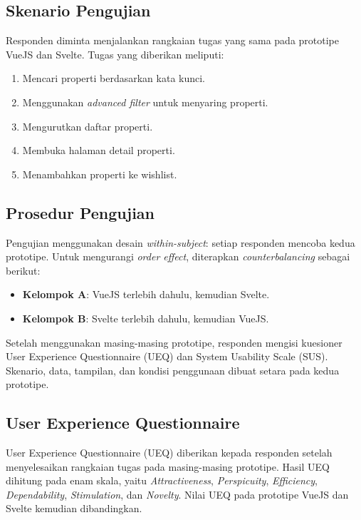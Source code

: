 \documentclass[12pt,a4paper]{report}
\begin{document}
\subsection{Skenario Pengujian}
\label{sec:skenario-ux}
Responden diminta menjalankan rangkaian tugas yang sama pada prototipe VueJS dan Svelte. Tugas yang diberikan meliputi:
\begin{enumerate}
    \item Mencari properti berdasarkan kata kunci.
    \item Menggunakan \textit{advanced filter} untuk menyaring properti.
    \item Mengurutkan daftar properti.
    \item Membuka halaman detail properti.
    \item Menambahkan properti ke wishlist.
\end{enumerate}

\subsection{Prosedur Pengujian}
\label{sec:prosedur-ux}
Pengujian menggunakan desain \textit{within-subject}: setiap responden mencoba kedua prototipe. Untuk mengurangi \textit{order effect}, diterapkan \textit{counterbalancing} sebagai berikut:
\begin{itemize}
    \item \textbf{Kelompok A}: VueJS terlebih dahulu, kemudian Svelte.
    \item \textbf{Kelompok B}: Svelte terlebih dahulu, kemudian VueJS.
\end{itemize}

Setelah menggunakan masing-masing prototipe, responden mengisi kuesioner User Experience Questionnaire (UEQ) dan System Usability Scale (SUS). Skenario, data, tampilan, dan kondisi penggunaan dibuat setara pada kedua prototipe.

\subsection{User Experience Questionnaire}
\label{sec:ueq-metode}
User Experience Questionnaire (UEQ) diberikan kepada responden setelah menyelesaikan rangkaian tugas pada masing-masing prototipe. Hasil UEQ dihitung pada enam skala, yaitu \textit{Attractiveness}, \textit{Perspicuity}, \textit{Efficiency}, \textit{Dependability}, \textit{Stimulation}, dan \textit{Novelty}. Nilai UEQ pada prototipe VueJS dan Svelte kemudian dibandingkan.
\end{document}
